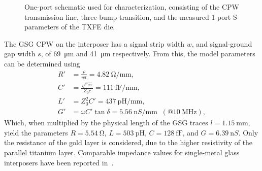 \documentclass[conference,a4paper]{IEEEtran}
\begin{document}
\begin{figure}[htbp]
    \centering
        \caption{One-port schematic used for characterization, consisting of the CPW transmission line, three-bump transition, and the measured 1-port S-parameters of the TXFE die. }
    \label{fig:lumped_element_model}
\end{figure}
%
The GSG CPW on the interposer has a signal strip width $w$, and signal-ground gap width $s$, of \SI{69}{\micro\meter} and \SI{41}{\micro\meter} respectively. From this, the model parameters can be determined using~\cite{Simons2004}
%
\begin{align}
    R'&=\frac{\rho}{wt}= \SI{4.82}{\ohm / \milli\meter},\\
    C'&=\frac{\sqrt{\varepsilon_{\text{eff}}}}{Z_{0}c}= \SI{111}{\femto\farad / \milli\meter},\\
    L'&=Z_{0}^{2}C' = \SI{437}{\pico\henry / \milli\meter},\\
    G'&=\omega C'\tan\delta= \SI{5.56}{ \nano S/\milli\meter} \;\;(@\SI{10}{\mega\hertz}),
\end{align}
%
Which, when multiplied by the physical length of the GSG traces $l=\SI{1.15}{\milli\metre}$, yield the parameters $R=\SI{5.54}{\ohm}$, $L=\SI{503}{\pico\henry}$, $C=\SI{128}{\femto\farad}$, and $G = \SI{6.39}{\nano S}$. Only the resistance of the gold layer is considered, due to the higher resistivity of the parallel titanium layer. Comparable impedance values for single-metal glass interposers have been reported in~\cite{Wang2016}.
\end{document}
